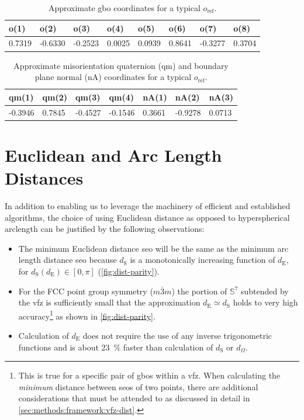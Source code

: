 \documentclass[preprint,12pt]{elsarticle}
\begin{document}
\begin{table}
\centering
\caption{Approximate \gls{gbo} coordinates for a typical $o_\text{ref}$. }
\label{tab:oref}
\begin{tabular}{@{}llllllll@{}}
\toprule
o(1)   & o(2)    & o(3)    & o(4)   & o(5)   & o(6)   & o(7)    & o(8)   \\ \midrule
0.7319 & -0.6330 & -0.2523 & 0.0025 & 0.0939 & 0.8641 & -0.3277 & 0.3704
\end{tabular}
\end{table}

\begin{table}
\centering
\caption{Approximate misorientation quaternion (qm) and boundary plane normal (nA) coordinates for a typical $o_\text{ref}$. }
\label{tab:oref-qm-nA}
\begin{tabular}{@{}lllllll@{}}
\toprule
qm(1)   & qm(2)  & qm(3)   & qm(4)   & nA(1)  & nA(2)   & nA(3)  \\ \midrule
-0.3946 & 0.7845 & -0.4527 & -0.1546 & 0.3661 & -0.9278 & 0.0713
\end{tabular}
\end{table}

\section{Euclidean and Arc Length Distances}
\label{sec:supp:dist-parity}

In addition to enabling us to leverage the machinery of efficient and established algorithms, the choice of using Euclidean distance as opposed to hyperspherical arclength can be justified by the following observations:
\begin{itemize}
	\item The minimum Euclidean distance \gls{seo} will be the same as the minimum arc length distance \gls{seo} because $d_{\text{S}}$ is a monotonically increasing function of $d_{\text{E}}$, for $d_{\text{S}}\!\left(d_{\text{E}}\right)\in[0,\pi]$ (\cref{fig:dist-parity}). 
	\item For the FCC point group symmetry ($m\bar{3}m$) the portion of $\mathbb{S}^7$ subtended by the \gls{vfz} is sufficiently small that the approximation $d_{\text{E}} \simeq d_{\text{S}}$ holds to very high accuracy\footnote{This is true for a specific pair of \glspl{gbo} within a \gls{vfz}. When calculating the \emph{minimum} distance between \glspl{seo} of two points, there are additional considerations that must be attended to as discussed in detail in \cref{sec:methods:framework:vfz-dist}.} as shown in \cref{fig:dist-parity}. 
	\item Calculation of $d_{\text{E}}$ does not require the use of any inverse trigonometric functions and is about \SI{23}{\percent} faster than calculation of $d_{\text{S}}$ or $d_\Omega$.
\end{itemize}
\end{document}
